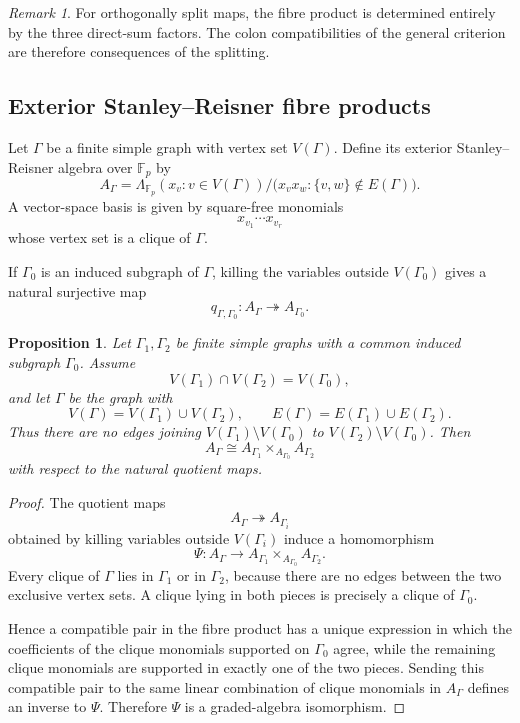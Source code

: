 \documentclass[12pt]{amsart}
\theoremstyle{plain}
\newtheorem{proposition}[theorem]{Proposition}
\theoremstyle{definition}
\theoremstyle{remark}
\newtheorem{remark}[theorem]{Remark}
\numberwithin{equation}{section}
\newcommand{\Fp}{\mathbb{F}_p}
\begin{document}
\begin{remark}
For orthogonally split maps, the fibre product is determined entirely by the
three direct-sum factors. The colon compatibilities of the general criterion
are therefore consequences of the splitting.
\end{remark}

\subsection{Exterior Stanley--Reisner fibre products}

Let \(\Gamma\) be a finite simple graph with vertex set \(V(\Gamma)\).
Define its exterior Stanley--Reisner algebra over \(\Fp\) by
\[
A_\Gamma
=
\Lambda_{\Fp}(x_v:v\in V(\Gamma))
\Big/
\bigl(x_vx_w:\{v,w\}\notin E(\Gamma)\bigr).
\]
A vector-space basis is given by square-free monomials
\[
x_{v_1}\cdots x_{v_r}
\]
whose vertex set is a clique of \(\Gamma\).

If \(\Gamma_0\) is an induced subgraph of \(\Gamma\), killing the
variables outside \(V(\Gamma_0)\) gives a natural surjective map
\[
q_{\Gamma,\Gamma_0}:A_\Gamma\twoheadrightarrow A_{\Gamma_0}.
\]

\begin{proposition}
\label{prop:graph-pullback}
Let \(\Gamma_1,\Gamma_2\) be finite simple graphs with a common induced
subgraph \(\Gamma_0\). Assume
\[
V(\Gamma_1)\cap V(\Gamma_2)=V(\Gamma_0),
\]
and let \(\Gamma\) be the graph with
\[
V(\Gamma)=V(\Gamma_1)\cup V(\Gamma_2),
\qquad
E(\Gamma)=E(\Gamma_1)\cup E(\Gamma_2).
\]
Thus there are no edges joining
\(V(\Gamma_1)\setminus V(\Gamma_0)\) to
\(V(\Gamma_2)\setminus V(\Gamma_0)\). Then
\[
A_\Gamma
\cong
A_{\Gamma_1}\times_{A_{\Gamma_0}}A_{\Gamma_2}
\]
with respect to the natural quotient maps.
\end{proposition}

\begin{proof}
The quotient maps
\[
A_\Gamma\twoheadrightarrow A_{\Gamma_i}
\]
obtained by killing variables outside \(V(\Gamma_i)\) induce a homomorphism
\[
\Psi:A_\Gamma\longrightarrow
A_{\Gamma_1}\times_{A_{\Gamma_0}}A_{\Gamma_2}.
\]
Every clique of \(\Gamma\) lies in \(\Gamma_1\) or in \(\Gamma_2\),
because there are no edges between the two exclusive vertex sets. A clique
lying in both pieces is precisely a clique of \(\Gamma_0\).

Hence a compatible pair in the fibre product has a unique expression in
which the coefficients of the clique monomials supported on \(\Gamma_0\)
agree, while the remaining clique monomials are supported in exactly one of
the two pieces. Sending this compatible pair to the same linear combination
of clique monomials in \(A_\Gamma\) defines an inverse to \(\Psi\).
Therefore \(\Psi\) is a graded-algebra isomorphism.
\end{proof}
\end{document}
